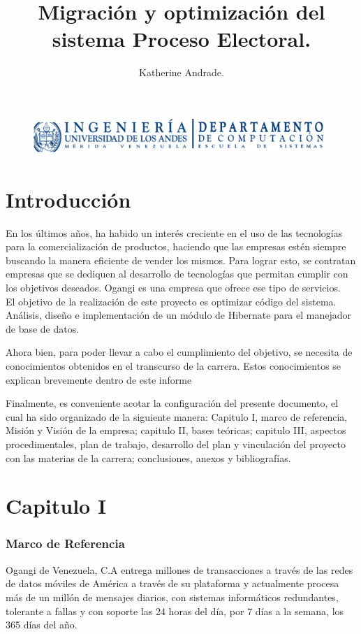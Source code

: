 \documentclass[spanish]{article}
\title{Migración y optimización del sistema Proceso Electoral.}
\author{Katherine Andrade.}
\date{}
\begin{document}
\begin{figure}
	\centering
	\includegraphics[width=0.99\textwidth]{Logo_computacion}
\end{figure}


\maketitle

\section{Introducción}

En los últimos años, ha habido un interés creciente en el uso de las tecnologías para la comercialización de productos, haciendo que las empresas estén siempre buscando la manera eficiente de vender los mismos. Para lograr esto, se contratan empresas que se dediquen al desarrollo de tecnologías que permitan cumplir con los objetivos deseados. Ogangi es una empresa que ofrece ese tipo de servicios. \\

El objetivo de la realización de este proyecto es optimizar código del sistema. Análisis, diseño e implementación de un módulo de Hibernate para el manejador de base de datos.  

Ahora bien, para poder llevar a cabo el cumplimiento del objetivo, se necesita de conocimientos obtenidos en el transcurso de la carrera. Estos conocimientos se explican brevemente dentro de este informe 

Finalmente, es conveniente acotar la configuración del presente documento, el cual ha sido organizado de la siguiente manera: Capitulo I, marco de referencia, Misión y Visión de la empresa; capitulo II, bases teóricas; capitulo III, aspectos procedimentales, plan de trabajo, desarrollo del plan y vinculación del proyecto con las materias de la carrera; conclusiones, anexos y bibliografías.

\section{Capitulo I}

\subsubsection{Marco de Referencia}
Ogangi de Venezuela, C.A entrega millones de transacciones a través de las redes de
datos móviles de América a través de su plataforma y actualmente procesa más de un millón de
mensajes diarios, con sistemas informáticos redundantes, tolerante a fallas y con soporte las 24
horas del día, por 7 días a la semana, los 365 días del año.
\end{document}
